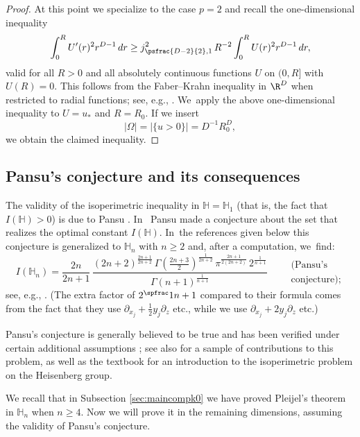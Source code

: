 \begin{proof}
At this point we specialize to the case $p=2$ and recall the one-dimensional inequality
\[
\int_0^R U'(r)^2 r^{D-1}\,dr \geq j_{\psfrac{D-2}{2},1}^2 \,R^{-2} \int_0^R U(r)^2 r^{D-1}\,dr,
\]
valid for all $R>0$ and all absolutely continuous functions $U$ on $(0,R]$ with \hbox{$U(R)=0$}. This follows from the Faber--Krahn inequality in $\R^D$ when restricted to radial functions; see, e.g., \cite[Th.\,2.54]{FLW}. We~apply the above one-dimensional inequality to $U=u_*$ and $R=R_0$. If we insert
\[
|\Omega| = |\{ u>0\}| = D^{-1} R_0^D,
\]
we obtain the claimed inequality.
\end{proof}

\subsection{Pansu's conjecture and its consequences}
The validity of the isoperimetric inequality in $\mathbb H=\mathbb H_1$ (that is, the fact that $I(\mathbb H)>0$) is due to Pansu \cite{Pa}. In~\cite{Pa2} Pansu made a conjecture about the set that realizes the optimal constant $I(\mathbb H)$. In~the references given below this conjecture is generalized to $\mathbb H_n$ with $n\geq 2$ and, after a computation, we~find:
\begin{equation}
\label{eq:pansusconj}
I(\mathbb H_n) = \frac{2n}{2n+1} \,\frac{(2n+2)^{\frac{2n+1}{2n+2}} \,\Gamma(\tfrac{2n+3}{2})^\frac 1{2n+2}\, \pi^\frac{2n+1}{2(2n+2)}\, 2^\frac 1{n+1}}{\Gamma(n+1)^\frac 1{n+1}} \qquad\begin{array}{l} \text{(Pansu's}\\\text{conjecture);}\end{array}
\end{equation}
see, e.g., \cite{DGN2}. (The extra factor of $2^\spfrac1{n+1}$ compared to their formula comes from the fact that they use $\partial_{x_j} +\frac12 y_j\partial_z$ etc., while we use $\partial_{x_j} + 2y_j\partial_z$ etc.)

Pansu's conjecture is generally believed to be true and has been verified under certain additional assumptions \cite{RR,DGN2,RR2,Ri,Mon,MoRi}; see also \cite{LeRi,LeMa,ChChHwYa,ChHwMaYa} for a sample of contributions to this problem, as well as the textbook \cite{CaDaPaTy} for an introduction to the isoperimetric problem on the Heisenberg group.

We recall that in Subsection \ref{sec:maincompk0} we have proved Pleijel's theorem in $\mathbb H_n$ when $n\geq 4$. Now we will prove it in the remaining dimensions, assuming the validity of Pansu's conjecture.

